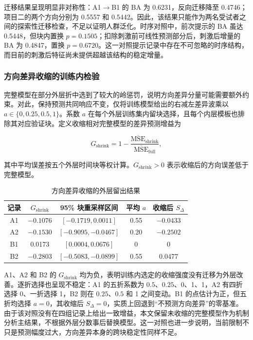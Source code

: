 \documentclass[a4paper,zihao=-4,linespread=1]{ctexart}
\numberwithin{figure}{section}       %
\begin{document}
迁移结果呈现明显非对称性：A1$\rightarrow$B1 的 BA 为 0.6231，反向迁移降至 0.4746；项目二的两个方向分别为 0.5557 和 0.5442。因此，该结果只能作为两名受试者之间的探索性迁移检查，不足以证明人群泛化。时序对照中，前次提示的 BA 虽达 0.5448，但块内置换 $p=0.1505$；扣除刺激前可线性预测部分后，刺激后增量的 BA 为 0.4847，置换 $p=0.6720$。这一对照提示记录中存在不可忽略的时序结构，而目前的刺激后特征尚未提供超越该结构的稳定增量。

\subsubsection{方向差异收缩的训练内检验}

完整模型在部分外层折中选到了较大的岭惩罚，说明方向差异分量可能需要额外约束。对此，保持预测共同响应不变，仅将训练模型给出的右减左差异波乘以 $a\in\{0,0.25,0.5,1\}$。系数 $a$ 在每个外层训练集内留块选择，且每个内层模板也排除其对应验证块。定义收缩相对完整模型的差异预测增益为

\begin{equation}
G_{\mathrm{shrink}}
=1-
\frac{\overline{\mathrm{MSE}}_{\mathrm{shrink}}}
{\overline{\mathrm{MSE}}_{\mathrm{full}}},
\label{eq:q2_direction_shrink}
\end{equation}

其中平均误差按五个外层时间块等权计算。$G_{\mathrm{shrink}}>0$ 表示收缩后的方向误差低于完整模型。

\begin{table}[H]
\centering
\caption{方向差异收缩的外层留出结果}
\label{tab:q2_direction_shrink}
\small
\begin{tabular}{ccccc}
\toprule
\textbf{记录} & \textbf{$G_{\mathrm{shrink}}$} & \textbf{95\% 块重采样区间} & \textbf{平均 $a$} & \textbf{收缩后 $S_\Delta$} \\
\midrule
A1 & $-0.1076$ & $[-0.1719, 0.0011]$ & 0.55 & $-0.0433$ \\
A2 & $-0.1530$ & $[-0.9095, -0.0467]$ & 0.20 & $-0.2502$ \\
B1 & 0.0173 & $[0.0004, 0.0676]$ & 0 & 0 \\
B2 & $-0.2803$ & $[-0.5083, -0.0899]$ & 0.55 & 0.0477 \\
\bottomrule
\end{tabular}
\end{table}

A1、A2 和 B2 的 $G_{\mathrm{shrink}}$ 均为负，表明训练内选定的收缩强度没有迁移为外层改善。逐折选择也呈现不稳定：A1 的五折系数为 $0.5$、$0.25$、0、1、1，A2 有四折选择 0、一折选择 1，B2 则在 $0.25$、$0.5$ 和 1 之间变动。B1 的点估计为正，但五折均选择 $a=0$，其收缩后 $S_\Delta=0$，实质上回退到“不预测方向差异”的零基准。由于该对照没有在四组记录上给出一致增益，本文保留未收缩的完整模型作为机制分析主结果，不根据外层分数事后替换模型。这一对照也进一步说明，当前限制不只是预测幅度过大，方向差异本身的跨块稳定性同样不足。
\end{document}
